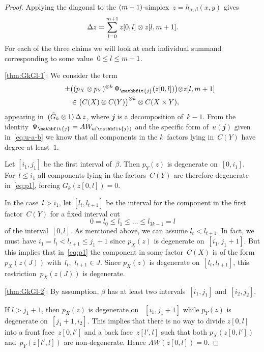 \documentclass[letterpaper]{amsart}
\numberwithin{equation}{section}
\theoremstyle{plain}
\theoremstyle{definition}
\theoremstyle{remark}
\def\jj{\mathbfit{j}}
\def\AW{AW}
\def\AWu#1{\AW_{\mkern -1mu #1}}
\def\restr#1#2#3{#1[#2,#3]}
\begin{document}
\begin{proof}
  Applying the diagonal to the $(m+1)$-simplex~$z=h_{\alpha,\beta}(x,y)$ gives
  \begin{equation}
    \label{eq:p0}
    \Delta z = \sum_{l=0}^{\n+1} \restr{z}{0}{l}\otimes \restr{z}{l}{\n+1}.
  \end{equation}
  For each of the three claims we will look at each individual summand corresponding to some value~$0\le l\le m+1$.

  \ref{thm:GkGl-1}:
  We consider the term
  \begin{multline}
    \label{eq:p1}
    \qquad
    \pm\bigl((p_{X}\otimes p_{Y})^{\otimes k}\,\Psi_{\jj}(\restr{z}{0}{l})\bigl) \otimes \restr{z}{l}{\n+1} \\
    \in \bigl(C(X)\otimes C(Y)\bigr)^{\otimes k}\otimes C(X\times Y),
    \qquad
  \end{multline}
  appearing in~$(\tilde G_{k}\otimes 1)\,\Delta\,z$, where $\jj$ is a decomposition of~$k-1$.
  From the identity~$\Psi_{\jj}=\AWu{u(\jj)}$ and the specific form of~$u(\jj)$ given in~\eqref{eq:u-a-b}
  we know that all components in the $k$~factors lying in~$C(Y)$ have degree at least~$1$.

  Let $[i_{1},j_{1}]$ be the first interval of~$\beta$.
  Then $p_{Y}(z)$ is degenerate on~$[0,i_{1}]$.
  For~$l\le i_{1}$ all components lying in the factors~$C(Y)$ are therefore degenerate
  in~\eqref{eq:p1}, forcing $G_{k}(\restr{z}{0}{l})=0$.

  \def\nn{l}
  In the case~$l>i_{1}$, let $[\nn_{t},\nn_{t+1}]$ be the interval for the component in the first factor~$C(Y)$
  for a fixed interval cut
  \begin{equation}
    0 = \nn_{0} \le \nn_{1} \le \dots \le \nn_{3k-1} = l
  \end{equation}
  of the interval~$[0,l]$. As mentioned above, we can assume $\nn_{t}<\nn_{t+1}$.
  In fact, we must have $i_{1}=\nn_{t}<\nn_{t+1}\le j_{1}+1$ since $p_{X}(z)$ is degenerate on~$[i_{1},j_{1}+1]$.
  But this implies that in~\eqref{eq:p1} the component in some factor~$C(X)$ is
  of the form~$p_{X}(z(J))$ with~$\nn_{t}$,~$\nn_{t+1}\in J$.
  Since $p_{X}(z)$ is degenerate on~$[\nn_{t},\nn_{t+1}]$, this restriction~$p_{X}(z(J))$ is degenerate.

  \ref{thm:GkGl-2}:
  By assumption, $\beta$ has at least two intervals~$[i_{1},j_{1}]$ and~$[i_{2},j_{2}]$.
  
  If $l>j_{1}+1$, then $p_{X}(z)$ is degenerate on ~$[i_{1},j_{1}+1]$
  while $p_{Y}(z)$ is degenerate on~$[j_{1}+1,i_{2}]$. This implies that there is no way
  to divide $\restr{z}{0}{l}$ into a front face~$\restr{z}{0}{l'}$ and a back face~$\restr{z}{l'}{l}$ such that both
  $p_{X}(\restr{z}{0}{l'})$ and~$p_{Y}(\restr{z}{l'}{l})$
  are non-degenerate. Hence $\AW(\restr{z}{0}{l})=0$.
  

\end{proof}
\end{document}
